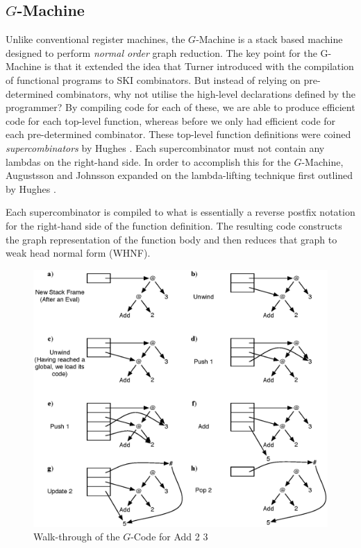  \subsection{$G$-Machine}
    Unlike conventional register machines, the $G$-Machine is a stack based
machine designed to perform \emph{normal order} graph reduction.
    The key point for the G-Machine \citep{Augustsson:LazyMLCompiler}
is that it extended the idea that Turner introduced
with the compilation of functional programs to SKI combinators.
But instead of relying on pre-determined combinators, why not
utilise the high-level declarations defined by the programmer? By compiling
code for each of these, we are able to produce
efficient code for each top-level function, whereas before we only had efficient
code for each pre-determined combinator. These top-level function definitions
were coined \emph{supercombinators} by Hughes \citep{hughes:thesis}. Each
supercombinator must not contain any lambdas on the right-hand side. In order to
accomplish this for the $G$-Machine, Augustsson and
Johnsson expanded on the lambda-lifting technique first outlined by Hughes
\citep{Augustsson:LazyMLCompiler, hughes:thesis}.

Each supercombinator is compiled to what is essentially a reverse postfix
notation for the right-hand side of the function definition.  The resulting
code constructs the graph representation of the function body and then
reduces that graph to weak head normal form (WHNF).

\begin{figure}[h!]
  \centering
  \includegraphics[scale=0.55]{Background/figures/AddExample.eps}
  \caption[G-Code execution example]
   {Walk-through of the \(G\)-Code for Add 2 3}
  \label{example:gCode}
\end{figure}

